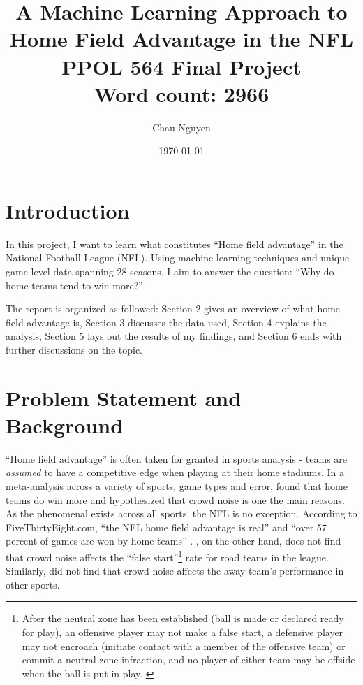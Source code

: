 \documentclass[12pt, letterpaper, twoside]{article}
\begin{document}
\title{%
A Machine Learning Approach to Home Field Advantage in the NFL  \\ 
\large PPOL 564 Final Project \\
\normalsize Word count: 2966}
\author{Chau Nguyen}
\date{\today}
\maketitle


\section{Introduction}

In this project, I want to learn what constitutes ``Home field advantage'' in the National Football League (NFL). Using machine learning techniques and unique game-level data spanning 28 seasons, I aim to answer the question: ``Why do home teams tend to win more?''

The report is organized as followed: Section 2 gives an overview of what home field advantage is, Section 3 discusses the data used, Section 4 explains the analysis, Section 5 lays out the results of my findings, and Section 6 ends with further discussions on the topic. 

\section{Problem Statement and Background}

``Home field advantage'' is often taken for granted in sports analysis - teams are \textit{assumed} to have a competitive edge when playing at their home stadiums. In a meta-analysis across  a variety of sports, game types and error, \cite{hfa1} found that home teams do win more and hypothesized that crowd noise is one the main reasons. As the phenomenal exists across all sports, the NFL is no exception.  According to FiveThirtyEight.com, ``the NFL home field advantage is real'' and ``over 57 percent of games are won by home teams'' \citep{538}. \cite{538}, on the other hand, does not find that crowd noise affects the ``false start''\footnote{After the neutral zone has been established (ball is made or declared ready for play), an offensive player may not make a false start, a defensive player may not encroach (initiate contact with a member of the offensive team) or commit a neutral zone infraction, and no player of either team may be offside when the ball is put in play. \citep{falsestart}} rate for road teams in the league. Similarly, \cite{scorecasting} did not find that crowd noise affects the away team's performance in other sports. 
\end{document}
